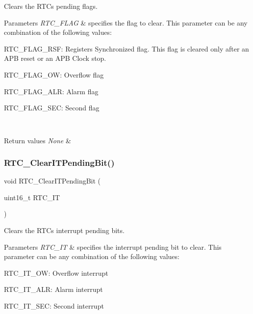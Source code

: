 Clears the R\+TC\textquotesingle{}s pending flags. 


\begin{DoxyParams}{Parameters}
{\em R\+T\+C\+\_\+\+F\+L\+AG} & specifies the flag to clear. This parameter can be any combination of the following values\+: \begin{DoxyItemize}
\item R\+T\+C\+\_\+\+F\+L\+A\+G\+\_\+\+R\+SF\+: Registers Synchronized flag. This flag is cleared only after an A\+PB reset or an A\+PB Clock stop. \item R\+T\+C\+\_\+\+F\+L\+A\+G\+\_\+\+OW\+: Overflow flag \item R\+T\+C\+\_\+\+F\+L\+A\+G\+\_\+\+A\+LR\+: Alarm flag \item R\+T\+C\+\_\+\+F\+L\+A\+G\+\_\+\+S\+EC\+: Second flag \end{DoxyItemize}
\\
\hline
\end{DoxyParams}

\begin{DoxyRetVals}{Return values}
{\em None} & \\
\hline
\end{DoxyRetVals}
\mbox{\label{group___r_t_c___private___functions_ga62b9a04d89a11f28db7dcfd50d9ee768}} 
\subsubsection{\texorpdfstring{RTC\_ClearITPendingBit()}{RTC\_ClearITPendingBit()}}
{\footnotesize\ttfamily void R\+T\+C\+\_\+\+Clear\+I\+T\+Pending\+Bit (\begin{DoxyParamCaption}\item[{uint16\+\_\+t}]{R\+T\+C\+\_\+\+IT }\end{DoxyParamCaption})}



Clears the R\+TC\textquotesingle{}s interrupt pending bits. 


\begin{DoxyParams}{Parameters}
{\em R\+T\+C\+\_\+\+IT} & specifies the interrupt pending bit to clear. This parameter can be any combination of the following values\+: \begin{DoxyItemize}
\item R\+T\+C\+\_\+\+I\+T\+\_\+\+OW\+: Overflow interrupt \item R\+T\+C\+\_\+\+I\+T\+\_\+\+A\+LR\+: Alarm interrupt \item R\+T\+C\+\_\+\+I\+T\+\_\+\+S\+EC\+: Second interrupt \end{DoxyItemize}
\\
\hline
\end{DoxyParams}

